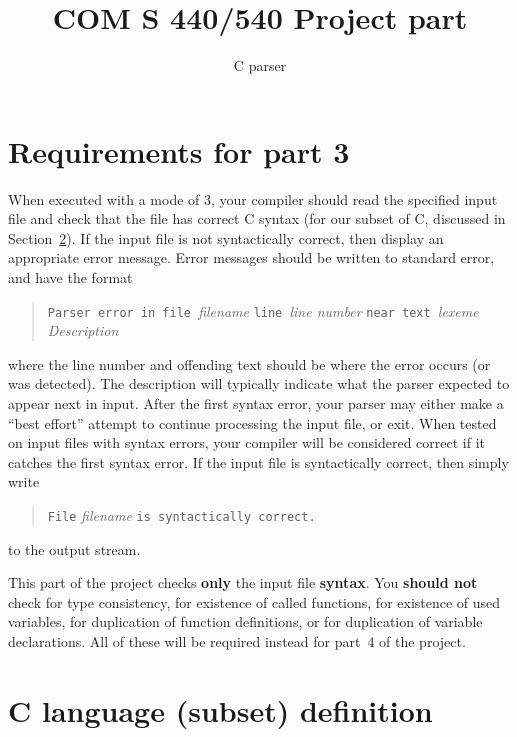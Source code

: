\documentclass{article}
\title{COM S 440/540 Project part \thispart}
\author{C parser}
\date{}
\newcommand{\thispart}{3}
\newcommand{\typecheck}{4}
\begin{document}
\maketitle


\section{Requirements for part \thispart}

When executed with a mode of \thispart,
your compiler should read the specified input file
and check that the file has correct C syntax
(for our subset of C, discussed in Section~\ref{SEC:language}).
If the input file is not syntactically correct,
then display an appropriate error message.
Error messages should be written to standard error,
and have the format
\begin{quote}
  \begin{tabbing}
		{\tt Parser }\={\tt error in file }\emph{filename}
		{\tt line }\emph{line number}
		{\tt near text }\emph{lexeme}
	\\
		\> \emph{Description}
  \end{tabbing}
\end{quote}
where the line number and offending text should
be where the error occurs (or was detected).
The description will typically indicate
what the parser expected to appear next in input.
After the first syntax error,
your parser may either make a ``best effort''
attempt to continue processing the input file, or exit.
When tested on input files with syntax errors,
your compiler will be considered correct if it catches the first syntax error.
If the input file is syntactically correct,
then simply write
\begin{quote}
  \verb|File| \emph{filename} \verb|is syntactically correct.|
\end{quote}
to the output stream.

This part of the project checks {\bf only} the input file {\bf syntax}.
You {\bf should not} check for type consistency,
for existence of called functions,
for existence of used variables,
for duplication of function definitions,
  or for duplication of variable declarations.
All of these will be required instead for part~\typecheck{} of the project.


\section{C language (subset) definition} \label{SEC:language}
\end{document}
